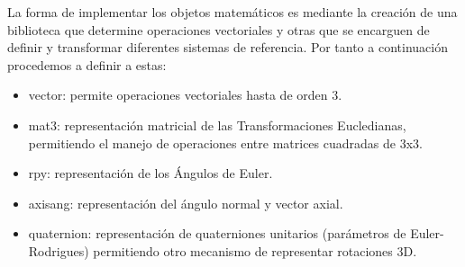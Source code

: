 \documentclass[main.tex]{subfiles}
\begin{document}
La forma de implementar los objetos matemáticos es mediante la creación de una biblioteca que determine operaciones vectoriales y otras que se encarguen de definir y transformar diferentes sistemas de referencia. Por tanto a continuación procedemos a definir a estas:

\begin{itemize}
\item vector:
	permite operaciones vectoriales hasta de orden 3.
\item mat3: 
	representación matricial de las Transformaciones Eucledianas, permitiendo el manejo de 			operaciones entre matrices cuadradas de 3x3.
\item rpy:
	representación de los Ángulos de Euler.
\item axisang:
	representación del ángulo normal y vector axial.
\item quaternion:
	representación de quaterniones unitarios (parámetros de Euler-Rodrigues) permitiendo otro 		mecanismo de representar rotaciones 3D.
\end{itemize}
\end{document}
